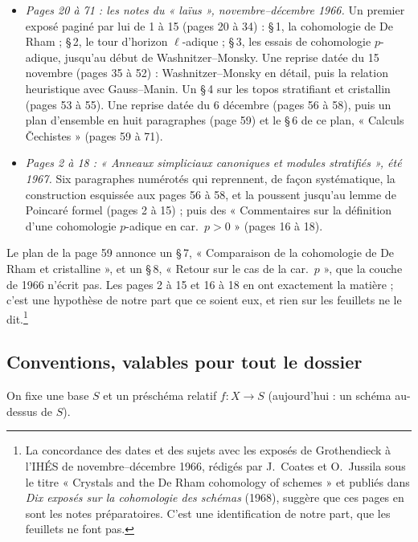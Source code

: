 \documentclass[11pt,a4paper]{article}
\begin{document}
\begin{itemize}
\item \emph{Pages 20 à 71 : les notes du « laïus », novembre--décembre 1966.}
  Un premier exposé paginé par lui de 1 à 15 (pages 20 à 34) : §\,1, la
  cohomologie de De Rham ; §\,2, le tour d'horizon $\ell$-adique ; §\,3, les
  essais de cohomologie $p$-adique, jusqu'au début de Washnitzer--Monsky. Une
  reprise datée du 15 novembre (pages 35 à 52) : Washnitzer--Monsky en
  détail, puis la relation heuristique avec Gauss--Manin. Un §\,4 sur les
  topos stratifiant et cristallin (pages 53 à 55). Une reprise datée du
  6 décembre (pages 56 à 58), puis un plan d'ensemble en huit paragraphes
  (page 59) et le §\,6 de ce plan, « Calculs Čechistes » (pages 59 à 71).
\item \emph{Pages 2 à 18 : « Anneaux simpliciaux canoniques et modules
  stratifiés », été 1967.} Six paragraphes numérotés qui reprennent, de façon
  systématique, la construction esquissée aux pages 56 à 58, et la poussent
  jusqu'au lemme de Poincaré formel (pages 2 à 15) ; puis des « Commentaires
  sur la définition d'une cohomologie $p$-adique en car.\ $p > 0$ »
  (pages 16 à 18).
\end{itemize}

Le plan de la page 59 annonce un §\,7, « Comparaison de la cohomologie de De
Rham et cristalline », et un §\,8, « Retour sur le cas de la car.\ $p$ », que
la couche de 1966 n'écrit pas. Les pages 2 à 15 et 16 à 18 en ont exactement
la matière ; c'est une hypothèse de notre part que ce soient eux, et rien sur
les feuillets ne le dit.\footnote{La concordance des dates et des sujets avec
les exposés de Grothendieck à l'IHÉS de novembre--décembre 1966, rédigés par
J.~Coates et O.~Jussila sous le titre « Crystals and the De Rham cohomology
of schemes » et publiés dans \emph{Dix exposés sur la cohomologie des
schémas} (1968), suggère que ces pages en sont les notes préparatoires. C'est
une identification de notre part, que les feuillets ne font pas.}

\subsection*{Conventions, valables pour tout le dossier}

On fixe une base $S$ et un préschéma relatif $f : X \to S$ (aujourd'hui : un
schéma au-dessus de $S$).
\end{document}
